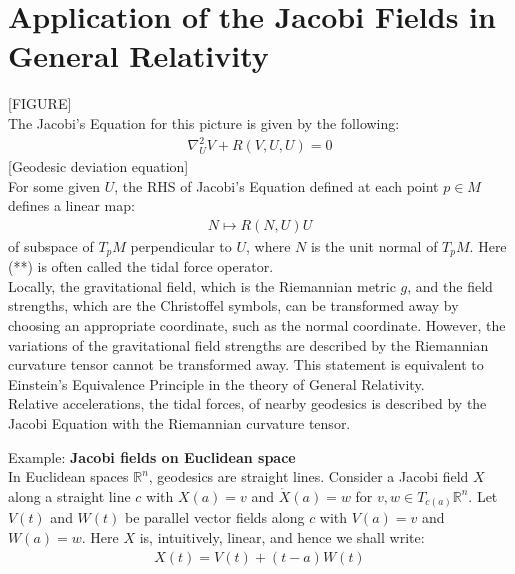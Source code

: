 \documentclass[11pt]{book}
\theoremstyle{break}
\theoremstyle{break}
\newcommand{\R}{\mathbb{R}}
\newcommand{\example}{\color{green}Example: \color{black}}
\begin{document}
\newpage
\section[Application of the Jacobi Fields in General Relativity]{\color{red} Application of the Jacobi Fields in General Relativity\color{black}}
[FIGURE]\\

The Jacobi's Equation for this picture is given by the following:
\begin{align*}
\nabla_U^2 V + R(V,U,U) = 0
\end{align*}
[Geodesic deviation equation]\\

For some given $U$, the RHS of Jacobi's Equation defined at each point $p \in M$ defines a linear map:
\begin{align*}
N \mapsto R(N,U)U \tag{**}
\end{align*}
of subspace of $T_pM$ perpendicular to $U$, where $N$ is the unit normal of $T_pM$.  Here (**) is often called the tidal force operator. \\

Locally, the gravitational field, which is the Riemannian metric $g$, and the field strengths, which are the Christoffel symbols, can be transformed away by choosing an appropriate coordinate, such as the normal coordinate. However, the variations of the gravitational field strengths are described by the Riemannian curvature tensor cannot be transformed away. This statement is equivalent to Einstein's Equivalence Principle in the theory of General Relativity. \\

Relative accelerations, the tidal forces, of nearby geodesics is described by the Jacobi Equation with the Riemannian curvature tensor. 

\newpage
\example \textbf{Jacobi fields on Euclidean space}\\
In Euclidean spaces $\R^n$, geodesics are straight lines. Consider a Jacobi field $X$ along a straight line $c$ with $X(a) = v$ and $\dot{X}(a) = w$ for $v,w\in T_{c(a)}\R^n$. Let $V(t)$ and $W(t)$ be parallel vector fields along $c$ with $V(a) = v$ and $W(a) = w$. Here $X$ is, intuitively, linear, and hence we shall write:
\begin{align*}
X(t) = V(t) + (t-a) W(t)
\end{align*}
\end{document}
